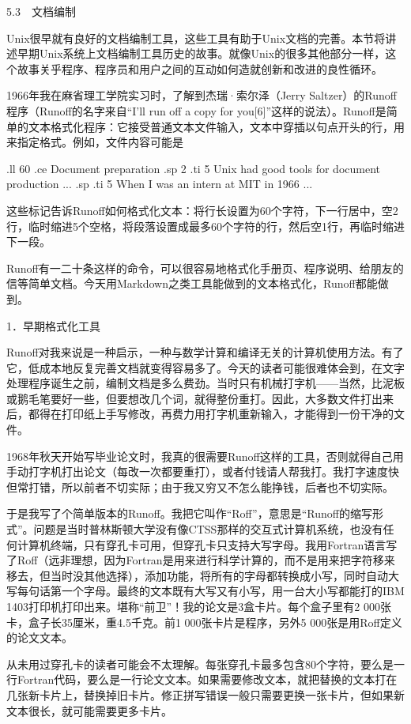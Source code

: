 \documentclass[a4paper,12pt,UTF8,twoside]{ctexbook}
\begin{document}
{{5.3　文档编制


Unix很早就有良好的文档编制工具，这些工具有助于Unix文档的完善。本节将讲述早期Unix系统上文档编制工具历史的故事。就像Unix的很多其他部分一样，这个故事关乎程序、程序员和用户之间的互动如何造就创新和改进的良性循环。

1966年我在麻省理工学院实习时，了解到杰瑞·索尔泽（Jerry Saltzer）的Runoff程序（Runoff的名字来自“I’ll run off a copy for you[6]”这样的说法）。Runoff是简单的文本格式化程序：它接受普通文本文件输入，文本中穿插以句点开头的行，用来指定格式。例如，文件内容可能是

.ll 60 .ce Document preparation .sp 2 .ti 5 Unix had good tools for document production ... .sp .ti 5 When I was an intern at MIT in 1966 ...

这些标记告诉Runoff如何格式化文本：将行长设置为60个字符，下一行居中，空2行，临时缩进5个空格，将段落设置成最多60个字符的行，然后空1行，再临时缩进下一段。

Runoff有一二十条这样的命令，可以很容易地格式化手册页、程序说明、给朋友的信等简单文档。今天用Markdown之类工具能做到的文本格式化，Runoff都能做到。





1．早期格式化工具


Runoff对我来说是一种启示，一种与数学计算和编译无关的计算机使用方法。有了它，低成本地反复完善文档就变得容易多了。今天的读者可能很难体会到，在文字处理程序诞生之前，编制文档是多么费劲。当时只有机械打字机——当然，比泥板或鹅毛笔要好一些，但要想改几个词，就得整份重打。因此，大多数文件打出来后，都得在打印纸上手写修改，再费力用打字机重新输入，才能得到一份干净的文件。

1968年秋天开始写毕业论文时，我真的很需要Runoff这样的工具，否则就得自己用手动打字机打出论文（每改一次都要重打），或者付钱请人帮我打。我打字速度快但常打错，所以前者不切实际；由于我又穷又不怎么能挣钱，后者也不切实际。

于是我写了个简单版本的Runoff。我把它叫作“Roff”，意思是“Runoff的缩写形式”。问题是当时普林斯顿大学没有像CTSS那样的交互式计算机系统，也没有任何计算机终端，只有穿孔卡可用，但穿孔卡只支持大写字母。我用Fortran语言写了Roff（远非理想，因为Fortran是用来进行科学计算的，而不是用来把字符移来移去，但当时没其他选择），添加功能，将所有的字母都转换成小写，同时自动大写每句话第一个字母。最终的文本既有大写又有小写，用一台大小写都能打的IBM 1403打印机打印出来。堪称“前卫”！我的论文是3盒卡片。每个盒子里有2 000张卡，盒子长35厘米，重4.5千克。前1 000张卡片是程序，另外5 000张是用Roff定义的论文文本。

从未用过穿孔卡的读者可能会不太理解。每张穿孔卡最多包含80个字符，要么是一行Fortran代码，要么是一行论文文本。如果需要修改文本，就把替换的文本打在几张新卡片上，替换掉旧卡片。修正拼写错误一般只需要更换一张卡片，但如果新文本很长，就可能需要更多卡片。

}}
\end{document}
